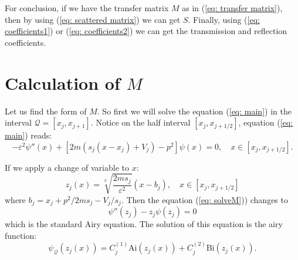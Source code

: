 \documentclass[12pt]{article}       %
\begin{document}
For conclusion, if we have the transfer matrix $M$ as in (\ref{eq: transfer matrix}), then by using (\ref{eq: scattered matrix}) we can get $S$. Finally, using (\ref{eq: coefficients1}) or (\ref{eq: coefficients2}) we can get the transmission and reflection coefficients.

\section{Calculation of $M$}
Let us find the form of $M$. So first we will solve the equation (\ref{eq: main}) in the interval $\mathcal{Q} = [x_j, x_{j+1}]$. Notice on the half interval $[x_j, x_{j+1/2}]$, equation (\ref{eq: main}) reads:
\begin{equation}\label{eq: solveM}
    -\varepsilon^2\psi''(x) + [2m(s_j(x-x_j) + V_j)-p^2]\psi(x) = 0, \quad x\in[x_j, x_{j+1/2}].
\end{equation}

If we apply a change of variable to $x$:
\begin{equation}
    z_j(x) = \sqrt[3]{\frac{2ms_j}{\varepsilon^2}}(x - b_j),\quad x\in[x_j, x_{j+1/2}]
\end{equation}
where $b_j = x_j + p^2/2ms_j - V_j/s_j$. Then the equation (\ref{eq: solveM})) changes to
\begin{equation}
    \psi''(z_j) - z_j\psi(z_j) = 0
\end{equation}
which is the standard Airy equation. The solution of this equation is the airy function:
\begin{equation}
    \psi_\mathcal{Q}(z_j(x)) = C_j^{(1)}\mathrm{Ai}(z_j(x)) + C_j^{(2)}\mathrm{Bi}(z_j(x)).
\end{equation}
\end{document}

